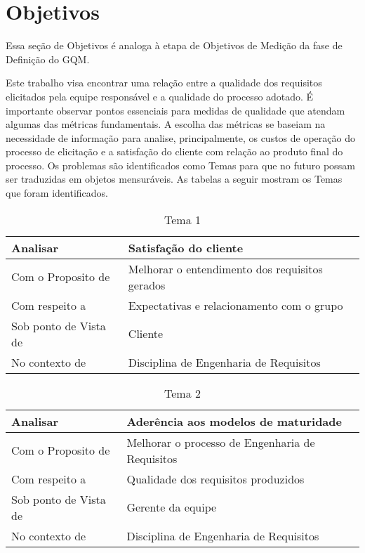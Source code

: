 \chapter{Objetivos}

Essa seção de Objetivos é analoga à etapa de Objetivos de Medição da fase de Definição do GQM.

Este trabalho visa encontrar uma relação entre a qualidade dos requisitos elicitados pela equipe responsável e a qualidade do processo adotado. É importante observar pontos essenciais para medidas de qualidade que atendam algumas das métricas fundamentais.
A escolha das métricas se baseiam na necessidade de informação para analise, principalmente, os custos de operação do processo de elicitação e a satisfação do cliente com relação ao produto final do processo. 
Os problemas são identificados como Temas para que no futuro possam ser traduzidas em objetos mensuráveis. As tabelas a seguir mostram os Temas que foram identificados.  

\begin{table}[H]
\centering
\caption{Tema 1}
\label{my-label}
\begin{tabular}{|l|l|}
\hline
Analisar              & Satisfação do cliente                          \\ \hline
Com o Proposito de    & Melhorar o entendimento dos requisitos gerados \\ \hline
Com respeito a        & Expectativas e relacionamento com o grupo      \\ \hline
Sob ponto de Vista de & Cliente                                        \\ \hline
No contexto de        & Disciplina de Engenharia de Requisitos         \\ \hline
\end{tabular}
\end{table}

\begin{table}[H]
\centering
\caption{Tema 2}
\label{my-label}
\begin{tabular}{|l|l|}
\hline
Analisar              & Aderência aos modelos de maturidade            		\\ \hline
Com o Proposito de    & Melhorar o processo de Engenharia de Requisitos 	\\ \hline
Com respeito a        & Qualidade dos requisitos produzidos      			\\ \hline
Sob ponto de Vista de & Gerente da equipe                                   \\ \hline
No contexto de        & Disciplina de Engenharia de Requisitos       		\\ \hline
\end{tabular}
\end{table}

